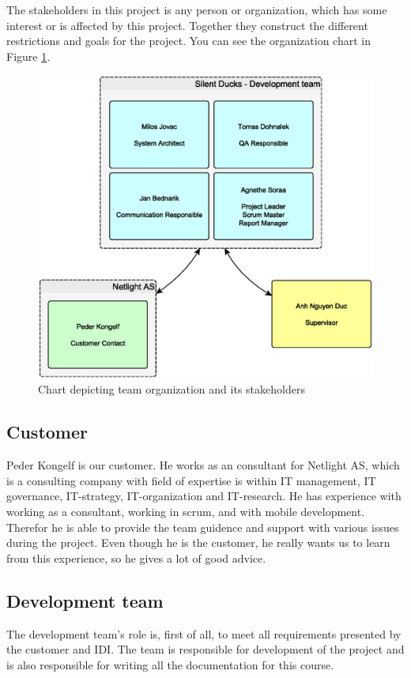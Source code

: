 The stakeholders in this project is any person or organization, which has some interest or is affected by this project. Together they construct the different restrictions and goals for the project. 
You can see the organization chart in Figure \ref{img:organization_chart}.

\begin{figure}[!ht]
    \begin{center}
    \includegraphics[width=12cm]{images/organization_chart.eps}
    \caption[Oganization chart]{Chart depicting team organization and its stakeholders}
    \label{img:organization_chart}
    \end{center}
\end{figure}

\subsection{Customer}
Peder Kongelf is our customer. He works as an consultant for Netlight AS, which is a consulting company with field of expertise is within IT management, IT governance, IT-strategy, IT-organization and IT-research. He has experience with working as a consultant, working in scrum,  and with mobile development. Therefor he is able to provide the team guidence and support with various issues during the project. Even though he is the customer, he really wants us to learn from this experience, so he gives a lot of good advice.      

\subsection{Development team}
The development team's role is, first of all, to meet all requirements presented by the customer and IDI. 
The team is responsible for development of the project and is also responsible for writing all the documentation for this course.  

